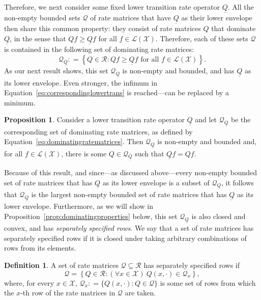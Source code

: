 \documentclass[10pt,a4paper]{paper}
\theoremstyle{definition}
\newtheorem{proposition}[theorem]{Proposition}
\newtheorem{definition}{Definition}
\newcommand{\states}{\mathcal{X}}
\newcommand{\gambles}{\mathcal{L}}
\newcommand{\gamblesX}{\gambles(\states)}
\newcommand{\rateset}{\mathcal{Q}}
\newcommand{\lrate}{\underline{Q}}
\newcommand{\coloneqq}{:\!=}
\begin{document}
Therefore, we next consider some fixed lower transition rate operator $\lrate$.
All the non-empty bounded sets $\rateset$ of rate matrices that have $\lrate$ as their lower envelope then share this common property: they consist of rate matrices $Q$ that dominate $\lrate$, in the sense that $Qf\geq\lrate f$ for all $f\in\gamblesX$. Therefore, each of these sets $\rateset$ is contained in the following set of dominating rate matrices:
\begin{equation}\label{eq:dominatingratematrices}
\rateset_{\lrate}\coloneqq
\left\{
Q\in\mathcal{R}
\colon
Qf\geq\lrate f\text{ for all $f\in\gamblesX$}
\right\}.
\end{equation}
As our next result shows, this set $\rateset_{\lrate}$ is non-empty and bounded, and has $\lrate$ as its lower envelope. Even stronger, the infimum in Equation~\eqref{eq:correspondinglowertrans} is reached---can be replaced by a minimum.

\begin{proposition}\label{prop:dominating_nonempty_bounded}
Consider a lower transition rate operator $\lrate$ and let $\rateset_{\lrate}$ be the corresponding set of dominating rate matrices, as defined by Equation~\eqref{eq:dominatingratematrices}. Then $\rateset_{\lrate}$ is non-empty and bounded and, for all $f\in\gamblesX$, there is some $Q\in\rateset_{\lrate}$ such that $\lrate f=Qf$.
\end{proposition}

\noindent
Because of this result, and since---as discussed above---every non-empty bounded set of rate matrices that has $\lrate$ as its lower envelope is a subset of $\rateset_{\lrate}$, it follows that $\rateset_{\lrate}$ is the largest non-empty bounded set of rate matrices that has $\lrate$ as its lower envelope.
Furthermore, as we will show in Proposition~\ref{prop:dominatingproperties} below, this set $\rateset_{\lrate}$ is also closed and convex, and has \emph{separately specified rows}. We say that a set of rate matrices has separately specified rows if it is closed under taking arbitrary combinations of rows from its elements.

\begin{definition}
A set of rate matrices $\rateset\subseteq\mathcal{R}$ has separately specified rows if
\begin{equation*}
\rateset=\left\{
Q\in\mathcal{R}
\colon
(\forall x\in\states)~Q(x,\cdot)\in\rateset_x\right\},
\end{equation*}
where, for every $x\in\states$, $\rateset_x\coloneqq\{Q(x,\cdot)\colon Q\in\rateset\}$ is some set of rows from which the $x$-th row of the rate matrices in $\rateset$ are taken.
\end{definition}
\end{document}
